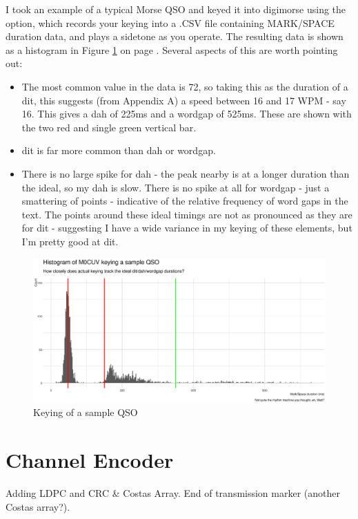 \documentclass[a4paper]{tufte-handout}
\newcommand{\textls}[2][5]{%
    \begingroup\addfontfeatures{LetterSpace=#1}#2\endgroup
  }
\renewcommand{\smallcapsspacing}[1]{\textls[10]{#1}}
\renewcommand{\textsc}[1]{\smallcapsspacing{\textsmallcaps{#1}}}
\begin{document}
I took an example of a typical Morse QSO\cite{Summers} and keyed it into digimorse using the \textsc{KeyerDiag} option, which records your keying into a .CSV file containing MARK/SPACE duration data, and plays a sidetone as you operate.
The resulting data is shown as a histogram in Figure \ref{fig:sampleqso} on page \pageref{fig:sampleqso}. Several aspects of this are worth pointing out:
\begin{itemize}
    \setlength\itemsep{-0.5em}
    \item The most common value in the data is 72, so taking this as the duration of a dit, this suggests (from Appendix A) a speed between 16 and 17 WPM - say 16. This gives a dah of 225ms and a wordgap of 525ms. These are shown with the two red and single green vertical bar.

	\item dit is far more common than dah or wordgap.
	\item There is no large spike for dah - the peak nearby is at a longer duration than the ideal, so my dah is slow. There is no spike at all for wordgap - just a smattering of points - indicative of the relative frequency of word gaps in the text. The points around these ideal timings are not as pronounced as they are for dit - suggesting I have a wide variance in my keying of these elements, but I'm pretty good at dit.

\end{itemize}  


    \begin{figure}[h]
        \includegraphics[width=\linewidth]{sample-qso-m0cuv}
        \caption{Keying of a sample QSO}
        \label{fig:sampleqso}
    \end{figure}


\section{Channel Encoder}
Adding LDPC and CRC \& Costas Array. End of transmission marker (another Costas array?).
\end{document}
